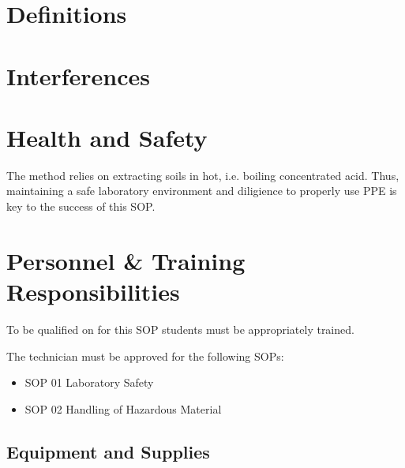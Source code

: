 \documentclass[12pt]{../SOP3_beta}\usepackage[]{graphicx}\usepackage[]{color}
\begin{document}
\section{Definitions}
\section{Interferences}
\section{Health and Safety}

\NP The method relies on extracting soils in hot, i.e. boiling concentrated acid. Thus, maintaining a safe laboratory environment and diligience to properly use PPE is key to the success of this SOP. 


\section{Personnel \& Training Responsibilities}

\NP To be qualified on for this SOP students must be appropriately trained.

The technician must be approved for the following SOPs:

\begin{itemize}
  \item SOP 01 Laboratory Safety
  \item SOP 02 Handling of Hazardous Material
\end{itemize}


\subsection{Equipment and Supplies}
\end{document}
